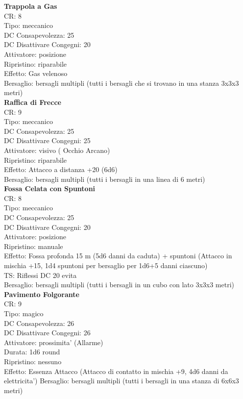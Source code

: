 \documentclass[a4paper,11pt,twoside,openany]{book}
\begin{document}
\begin{multicols}{2}
\textbf{Trappola a Gas}\\
CR: 8 \\
Tipo: meccanico \\
DC Consapevolezza: 25 \\
DC Disattivare Congegni: 20 \\
Attivatore: posizione \\
Ripristino: riparabile \\
Effetto: Gas velenoso \\
Bersaglio: bersagli multipli (tutti i bersagli che si trovano in una stanza 3x3x3 metri)\\

\textbf{Raffica di Frecce}\\
CR: 9 \\
Tipo: meccanico \\
DC Consapevolezza: 25 \\
DC Disattivare Congegni: 25 \\
Attivatore: visivo ( Occhio Arcano) \\
Ripristino: riparabile \\
Effetto: Attacco a distanza +20 (6d6) \\
Bersaglio: bersagli multipli (tutti i bersagli in una linea di 6 metri)\\

\textbf{Fossa Celata con Spuntoni}\\
CR: 8 \\
Tipo: meccanico \\
DC Consapevolezza: 25 \\
DC Disattivare Congegni: 20 \\
Attivatore: posizione \\
Ripristino: manuale \\
Effetto: Fossa profonda 15 m (5d6 danni da caduta) + spuntoni (Attacco in mischia +15, 1d4 spuntoni per bersaglio per 1d6+5 danni ciascuno) \\
TS: Riflessi DC 20 evita \\
Bersaglio: bersagli multipli (tutti i bersagli in un cubo con lato 3x3x3 metri)\\

\textbf{Pavimento Folgorante}\\
CR: 9 \\
Tipo: magico \\
DC Consapevolezza: 26 \\
DC Disattivare Congegni: 26 \\
Attivatore: prossimita' (Allarme) \\
Durata: 1d6 round \\
Ripristino: nessuno \\
Effetto: Essenza Attacco (Attacco di contatto in mischia +9, 4d6 danni da elettricita') 
Bersaglio: bersagli multipli (tutti i bersagli in una stanza di 6x6x3 metri)\\


\end{multicols}
\end{document}
